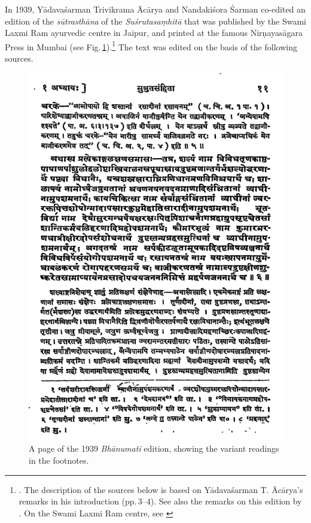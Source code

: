 In 1939, Yādavaśarman Trivikrama Ācārya and Nandakiśora Śarman co-edited an
edition of the \emph{sūtrasthāna} of the \emph{Suśrutasaṃhitā} that was 
published
by the Swami Laxmi Ram ayurvedic centre in Jaipur, and printed at the famous
Nirṇayasāgara Press in Mumbai (see 
Fig.\,\ref{bhanumati}).\footnote{\cite{acar-1939}.  The description of 
the sources 
below is based on Yādavaśarman T. Ācārya's  remarks in his introduction 
(pp.\,3--4). See also the remarks on this edition by
\citet[7]{kleb-2021a}.  On the Swami Laxmi Ram
centre, see \cite{hofe-2007}} The text was edited on the basis of the following 
sources.

\begin{figure}[p]
    \centering
    \includegraphics[draft=false,height=.9\textheight]{media/Bhanumati-page-11}
    \caption{A page of the 1939 \emph{Bhānumatī} edition, showing the variant 
        readings in 
        the 
        footnotes.}
    \label{bhanumati}
\end{figure}


